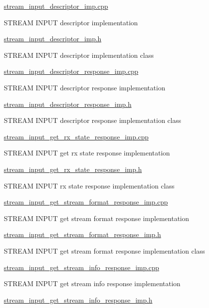 \hyperlink{stream__input__descriptor__imp_8cpp}{stream\+\_\+input\+\_\+descriptor\+\_\+imp.\+cpp}

S\+T\+R\+E\+AM I\+N\+P\+UT descriptor implementation

\hyperlink{stream__input__descriptor__imp_8h}{stream\+\_\+input\+\_\+descriptor\+\_\+imp.\+h}

S\+T\+R\+E\+AM I\+N\+P\+UT descriptor implementation class

\hyperlink{stream__input__descriptor__response__imp_8cpp}{stream\+\_\+input\+\_\+descriptor\+\_\+response\+\_\+imp.\+cpp}

S\+T\+R\+E\+AM I\+N\+P\+UT descriptor response implementation

\hyperlink{stream__input__descriptor__response__imp_8h}{stream\+\_\+input\+\_\+descriptor\+\_\+response\+\_\+imp.\+h}

S\+T\+R\+E\+AM I\+N\+P\+UT descriptor response implementation class

\hyperlink{stream__input__get__rx__state__response__imp_8cpp}{stream\+\_\+input\+\_\+get\+\_\+rx\+\_\+state\+\_\+response\+\_\+imp.\+cpp}

S\+T\+R\+E\+AM I\+N\+P\+UT get rx state response implementation

\hyperlink{stream__input__get__rx__state__response__imp_8h}{stream\+\_\+input\+\_\+get\+\_\+rx\+\_\+state\+\_\+response\+\_\+imp.\+h}

S\+T\+R\+E\+AM I\+N\+P\+UT rx state response implementation class

\hyperlink{stream__input__get__stream__format__response__imp_8cpp}{stream\+\_\+input\+\_\+get\+\_\+stream\+\_\+format\+\_\+response\+\_\+imp.\+cpp}

S\+T\+R\+E\+AM I\+N\+P\+UT get stream format response implementation

\hyperlink{stream__input__get__stream__format__response__imp_8h}{stream\+\_\+input\+\_\+get\+\_\+stream\+\_\+format\+\_\+response\+\_\+imp.\+h}

S\+T\+R\+E\+AM I\+N\+P\+UT get stream format response implementation class

\hyperlink{stream__input__get__stream__info__response__imp_8cpp}{stream\+\_\+input\+\_\+get\+\_\+stream\+\_\+info\+\_\+response\+\_\+imp.\+cpp}

S\+T\+R\+E\+AM I\+N\+P\+UT get stream info response implementation

\hyperlink{stream__input__get__stream__info__response__imp_8h}{stream\+\_\+input\+\_\+get\+\_\+stream\+\_\+info\+\_\+response\+\_\+imp.\+h}

